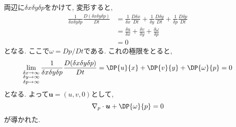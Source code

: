 \documentclass[a4j,12pt,openbib,oneside,dvipdfmx]{jarticle}
\begin{document}
\par
両辺に$\delta{x}\delta{y}\delta{p}$をかけて, 変形すると,
\begin{subequations}
\begin{align}
  \frac{1}{\delta{x}\delta{y}\delta{p}}\frac{D{(\delta{x}\delta{y}\delta{p})}}{Dt}&=\frac{1}{\delta{x}}\frac{D\delta{x}}{Dt}+\frac{1}{\delta{y}}\frac{D\delta{y}}{Dt}+\frac{1}{\delta{p}}\frac{D\delta{p}}{Dt}\\ \nonumber
  &=\frac{\delta{u}}{\delta{x}}+\frac{\delta{v}}{\delta{y}}+\frac{\delta\omega}{\delta{p}}\\ \nonumber
  &=0 \nonumber
\end{align}
\end{subequations}
となる. ここで$\omega=Dp/Dt$である. これの極限をとると,
\begin{equation}
  \lim_{\substack{\delta{x} \to \infty \\  \delta{y} \to \infty \\ \delta{p} \to \infty}} \frac{1}{\delta{x}\delta{y}\delta{p}}\frac{D{(\delta{x}\delta{y}\delta{p})}}{Dt}=\DP{u}{x}+\DP{v}{y}+\DP{\omega}{p}=0
\end{equation}
となる. よって$\bm{u}=(u,v,0)$として,
\begin{equation}
  \nabla_p\cdot\bm{u}+\DP{\omega}{p}=0
\end{equation}
が導かれた.
\end{document}
